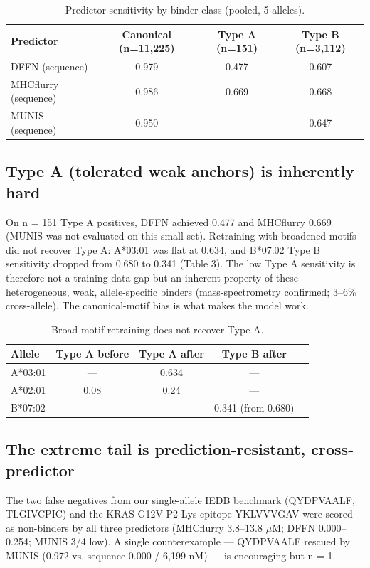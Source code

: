 \documentclass[10pt]{article}
\begin{document}
\begin{table}[h]
\centering
\caption{Predictor sensitivity by binder class (pooled, 5 alleles).}
\begin{tabular}{@{}lccc@{}}
\toprule
Predictor & Canonical (n=11,225) & Type A (n=151) & Type B (n=3,112) \\
\midrule
DFFN (sequence) & 0.979 & 0.477 & 0.607 \\
MHCflurry (sequence) & 0.986 & 0.669 & 0.668 \\
MUNIS (sequence) & 0.950 & --- & 0.647 \\
\bottomrule
\end{tabular}
\end{table}

\subsection{Type A (tolerated weak anchors) is inherently hard}
On n = 151 Type A positives, DFFN achieved 0.477 and MHCflurry 0.669 (MUNIS was not evaluated on this small set). Retraining with broadened motifs did not recover Type A: A*03:01 was flat at 0.634, and B*07:02 Type B sensitivity dropped from 0.680 to 0.341 (Table 3). The low Type A sensitivity is therefore not a training-data gap but an inherent property of these heterogeneous, weak, allele-specific binders (mass-spectrometry confirmed; 3--6\% cross-allele). The canonical-motif bias is what makes the model work.

\begin{table}[h]
\centering
\caption{Broad-motif retraining does not recover Type A.}
\begin{tabular}{@{}lcccc@{}}
\toprule
Allele & Type A before & Type A after & Type B after \\
\midrule
A*03:01 & --- & 0.634 & --- \\
A*02:01 & 0.08 & 0.24 & --- \\
B*07:02 & --- & --- & 0.341 (from 0.680) \\
\bottomrule
\end{tabular}
\end{table}

\subsection{The extreme tail is prediction-resistant, cross-predictor}
The two false negatives from our single-allele IEDB benchmark (QYDPVAALF, TLGIVCPIC) and the KRAS G12V P2-Lys epitope YKLVVVGAV were scored as non-binders by all three predictors (MHCflurry 3.8--13.8 $\mu$M; DFFN 0.000--0.254; MUNIS 3/4 low). A single counterexample --- QYDPVAALF rescued by MUNIS (0.972 vs. sequence 0.000 / 6,199 nM) --- is encouraging but n = 1.
\end{document}
